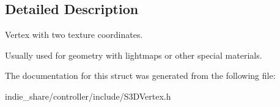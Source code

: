 \subsection{Detailed Description}
Vertex with two texture coordinates. 

Usually used for geometry with lightmaps or other special materials. 

The documentation for this struct was generated from the following file\+:\begin{DoxyCompactItemize}
\item 
indie\+\_\+share/controller/include/S3\+D\+Vertex.\+h\end{DoxyCompactItemize}
